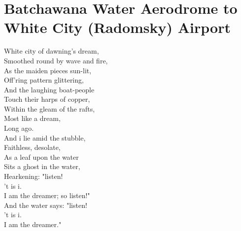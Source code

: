 \documentclass[smalldemyvopaper,11pt,twoside,onecolumn,openright,extrafontsizes]{memoir}
\begin{document}
\chapter{Batchawana Water Aerodrome to White City (Radomsky) Airport}
White city of dawning's dream,
\\Smoothed round by wave and fire,
\\As the maiden pieces sun-lit,
\\Off'ring pattern glittering,
\\And the laughing boat-people
\\Touch their harps of copper,
\\Within the gleam of the rafts,
\\Most like a dream,
\\Long ago.
\\And i lie amid the stubble,
\\Faithless, desolate,
\\As a leaf upon the water
\\Sits a ghost in the water,
\\Hearkening: "listen!
\\'t is i.
\\I am the dreamer; so listen!"
\\And the water says: "listen!
\\'t is i.
\\I am the dreamer."
\end{document}
